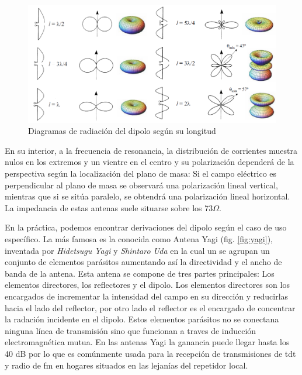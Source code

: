 \begin{figure}[h]
    \centering
        \includegraphics[width=15cm]{archivos/dipolo/radiaciones}
        \caption{Diagramas de radiación del dipolo según su longitud}
        \label{fig:diagramadipolo}
\end{figure}

\par En su interior, a la frecuencia de resonancia, la distribución de corrientes muestra nulos en los extremos y un vientre en el centro y su polarización dependerá de la perspectiva según la localización del plano de masa: Si el campo eléctrico es perpendicular al plano de masa se observará una polarización lineal vertical, mientras que si se sitúa paralelo, se obtendrá una polarización lineal horizontal. La impedancia de estas antenas suele situarse sobre los 73$\Omega$.
\\
\par En la práctica, podemos encontrar derivaciones del dipolo según el caso de uso específico. La más famosa es la conocida como Antena Yagi (fig. \ref{fig:yagi}), inventada por \textit{Hidetsugu Yagi} y \textit{Shintaro Uda} en la cual un se agrupan un conjunto de elementos parásitos aumentando así la directividad y el ancho de banda de la antena. Esta antena se compone de tres partes principales: Los elementos directores, los reflectores y el dipolo. Los elementos directores son los encargados de incrementar la intensidad del campo en su dirección y reducirlas hacia el lado del reflector, por otro lado el reflector es el encargado de concentrar la radación incidente en el dipolo. Estos elementos parásitos no se conectana  ninguna línea de transmisión sino que funcionan a traves de inducción electromagnética mutua. En las antenas Yagi la ganancia puede llegar hasta los 40 dB por lo que es comúnmente usada para la recepción de transmisiones de \gls{tdt} y radio de \gls{fm} en hogares situados en las lejanías del repetidor local.

